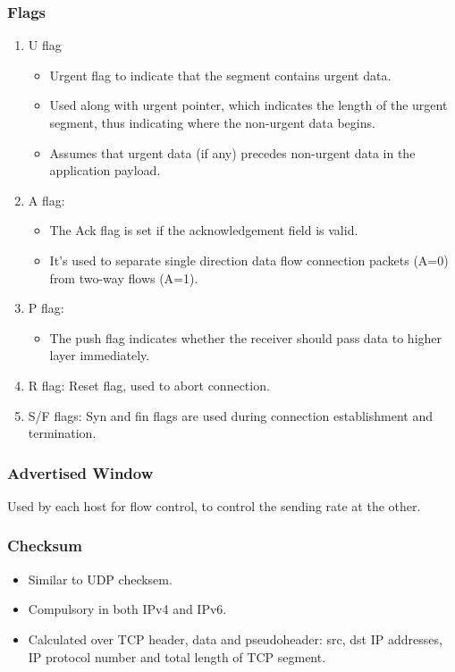 \documentclass{report}
\begin{document}
\subsubsection{Flags}
\begin{enumerate}
\item U flag
\begin{itemize}
\item Urgent flag to indicate that the segment contains urgent data.
\item Used along with urgent pointer, which indicates the length of the urgent segment, thus indicating where the non-urgent data begins.
\item Assumes that urgent data (if any) precedes non-urgent data in the application payload.
\end{itemize}
\item A flag:
\begin{itemize}
\item The Ack flag is set if the acknowledgement field is valid.
\item It's used to separate single direction data flow connection packets (A=0) from two-way flows (A=1).
\end{itemize}
\item P flag:
\begin{itemize}
\item The push flag indicates whether the receiver should pass data to higher layer immediately.
\end{itemize}
\item R flag: Reset flag, used to abort connection.
\item S/F flags: Syn and fin flags are used during connection establishment and termination.
\end{enumerate}
\subsubsection{Advertised Window}
Used by each host for flow control, to control the sending rate at the other.
\subsubsection{Checksum}
\begin{itemize}
\item Similar to UDP checksem.
\item Compulsory in both IPv4 and IPv6.
\item Calculated over TCP header, data and pseudoheader: src, dst IP addresses, IP protocol number and total length of TCP segment.
\end{itemize}
\end{document}
